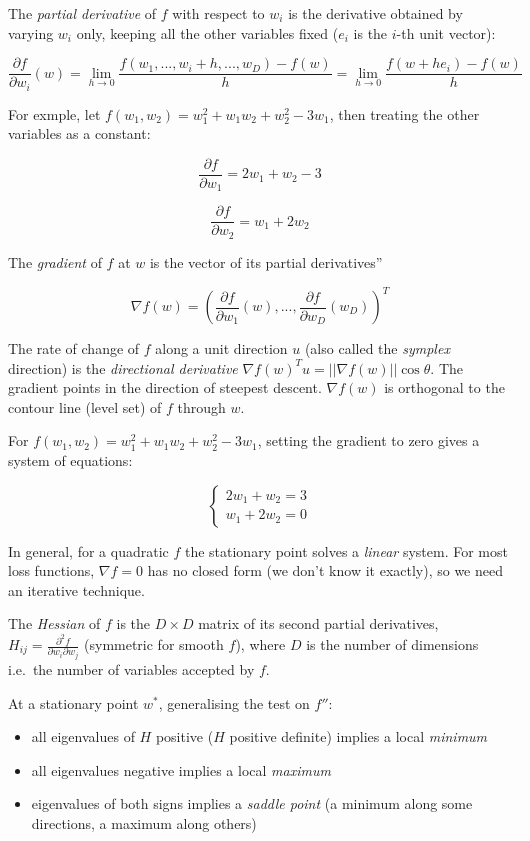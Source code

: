 \documentclass{article}
\begin{document}
The \emph{partial derivative} of \(f\) with respect to \(w_i\) is the
derivative obtained by varying \(w_i\) only, keeping all the other
variables fixed (\(e_i\) is the \(i\)-th unit vector):

\[\frac{\partial f}{\partial w_i} (w) = \lim_{h\rightarrow 0} \frac{f(w_1, ...,
w_i + h, ..., w_D) - f(w)}{h} = \lim_{h \rightarrow 0} \frac{f(w+he_i) -
f(w)}{h}\]

For exmple, let \(f(w_1, w_2) = w_1^2 + w_1w_2 + w_2^2 - 3w_1\), then
treating the other variables as a constant:

\[\frac{\partial f}{\partial w_1} = 2w_1 + w_2 - 3\]

\[\frac{\partial f}{\partial w_2} = w_1 + 2 w_2\]

The \emph{gradient} of \(f\) at \(w\) is the vector of its partial
derivatives''

\[\nabla f(w) = (\frac{\partial f}{\partial w_1} (w), ..., \frac{\partial f}{\partial w_D} (w_D))^T\]

The rate of change of \(f\) along a unit direction \(u\) (also called
the \emph{symplex} direction) is the \emph{directional derivative}
\(\nabla f(w)^T u = ||\nabla
f(w)||\cos \theta\). The gradient points in the direction of steepest
descent. \(\nabla f(w)\) is orthogonal to the contour line (level set)
of \(f\) through \(w\).

For \(f(w_1, w_2) = w_1^2 + w_1w_2 + w_2^2 - 3w_1\), setting the
gradient to zero gives a system of equations:

\[
\begin{cases}
2 w_1 + w_2 = 3 \\
w_1 + 2 w_2 = 0
\end{cases}
\]

In general, for a quadratic \(f\) the stationary point solves a
\emph{linear} system. For most loss functions, \(\nabla f=0\) has no
closed form (we don't know it exactly), so we need an iterative
technique.

The \emph{Hessian} of \(f\) is the \(D \times D\) matrix of its second
partial derivatives,
\(H_{ij} = \frac{\partial^2 f}{\partial w_i \partial w_j}\) (symmetric
for smooth \(f\)), where \(D\) is the number of dimensions i.e.~the
number of variables accepted by \(f\).

At a stationary point \(w^*\), generalising the test on \(f''\):

\begin{itemize}
\item
  all eigenvalues of \(H\) positive (\(H\) positive definite) implies a
  local \emph{minimum}
\item
  all eigenvalues negative implies a local \emph{maximum}
\item
  eigenvalues of both signs implies a \emph{saddle point} (a minimum
  along some directions, a maximum along others)
\end{itemize}
\end{document}
